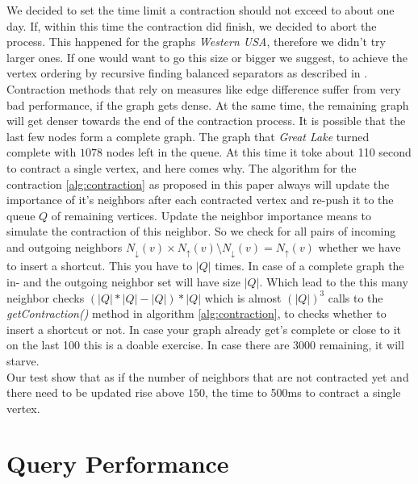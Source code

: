 We decided to set the time limit a contraction should not exceed to about one day.
If, within this time the contraction did finish, we decided to abort the process.
This happened for the graphs \textit{Western USA}, therefore we didn't try larger ones.
If one would want to go this size or bigger we suggest, to achieve the vertex ordering by recursive finding balanced separators as described in \cite[Customization Contraction Hierarchies]{CCH}.
\\
Contraction methods that rely on measures like edge difference suffer from very bad performance, if the graph gets dense.
At the same time, the remaining graph will get denser towards the end of the contraction process.
It is possible  that the last few nodes form a complete graph.
The graph that \textit{Great Lake} turned complete with $1078$ nodes left in the queue.
At this time it toke about 110 second to contract a single vertex, and here comes why.
The algorithm for the contraction \ref{alg:contraction} as proposed in this paper always will update the importance  of it's neighbors  after each contracted vertex and re-push it to the queue $Q$ of remaining vertices.
Update the neighbor importance means to simulate the contraction of this neighbor.
So we check for all pairs of incoming and outgoing neighbors $N_\downarrow(v) \times N_\uparrow(v) \setminus N_\downarrow(v) = N_\uparrow(v)$ whether we have to insert a shortcut.
This you have to $|Q|$ times.
In case of a complete graph the in- and the outgoing neighbor set will have size $|Q|$.
Which lead to the this many neighbor checks $(|Q| * |Q| - |Q|)*|Q|$ which is almost $(|Q|)^3$ calls to the \textit{getContraction()} method in algorithm \ref{alg:contraction}, to checks whether to insert a shortcut or not.
In case your graph already get's complete or close to it on the last 100 this is a doable exercise.
In case there are 3000 remaining, it will starve.
\\
Our test show that as if the number of neighbors that are not contracted yet and there need to be updated rise above $150$, the time to 500ms to contract a single vertex.

\section{Query Performance}

